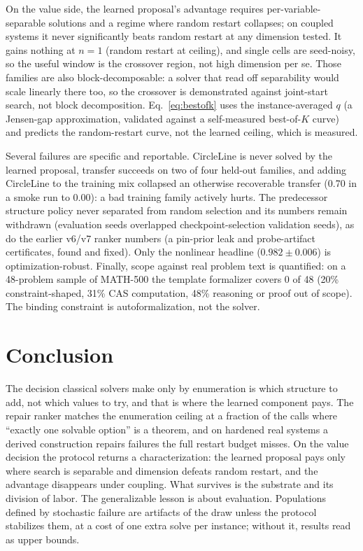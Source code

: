 \documentclass[letterpaper]{article} %
\begin{document}
On the value side, the learned
proposal's advantage requires per-variable-separable solutions and a regime where random
restart collapses; on coupled systems it never significantly beats random restart at any dimension
tested. It gains nothing at $n = 1$ (random restart at ceiling), and single cells are seed-noisy, so
the useful window is the crossover region, not high dimension per se. Those families are also
block-decomposable: a solver that read off separability would scale linearly there too, so
the crossover is demonstrated against joint-start search, not block decomposition. Eq.~\eqref{eq:bestofk} uses the instance-averaged $q$ (a Jensen-gap
approximation, validated against a self-measured best-of-$K$ curve) and predicts the
random-restart curve, not the learned ceiling, which is measured.

Several failures are specific and reportable. CircleLine is never solved
by the learned proposal, transfer succeeds on two of four held-out families, and adding
CircleLine to the training mix collapsed an otherwise recoverable transfer (0.70 in a smoke
run to 0.00): a bad training family actively hurts. The predecessor structure policy never
separated from random selection and its numbers remain withdrawn (evaluation seeds
overlapped checkpoint-selection validation seeds), as do the earlier v6/v7 ranker numbers
(a pin-prior leak and probe-artifact certificates, found and fixed). Only the nonlinear headline ($0.982 \pm 0.006$) is optimization-robust.
Finally, scope against real problem text is quantified: on a 48-problem sample of
MATH-500 \citep{hendrycks2021math} the template formalizer covers 0 of 48 (20\%
constraint-shaped, 31\% CAS computation, 48\% reasoning or proof out of
scope). The binding constraint is autoformalization, not the solver.

\section{Conclusion}
\label{sec:conclusion}

The decision classical solvers make only by enumeration is which structure to add, not which
values to try, and that is where the learned component pays. The repair ranker matches the
enumeration ceiling at a fraction of the calls where ``exactly one solvable option'' is a
theorem, and on hardened real systems a derived construction repairs failures the full
restart budget misses. On the value decision the protocol returns a characterization: the
learned proposal pays only where search is separable and dimension defeats random restart,
and the advantage disappears under coupling. What survives is the substrate and its division
of labor. The generalizable lesson is about evaluation. Populations defined by
stochastic failure are artifacts of the draw unless the protocol stabilizes them, at a cost
of one extra solve per instance; without it, results read as upper bounds.
\end{document}

